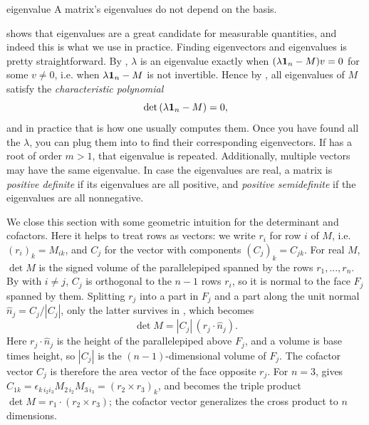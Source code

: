 \begin{proposition}{}{eigenvalue}
  A matrix's eigenvalues do not depend on the basis. 
\end{proposition}

 shows that eigenvalues are a great candidate
for measurable quantities, and indeed this is what we use in practice.
Finding eigenvectors and eigenvalues is pretty straightforward.
By , $\lambda$ is an eigenvalue exactly when
$(\lambda{\mathbf 1}_n-M)v=0$ for some $v\neq0$, i.e. when $\lambda{\mathbf 1}_n-M$ is not
invertible. Hence by ,
all eigenvalues of $M$ satisfy the
{\it characteristic polynomial}
\begin{equation}\label{eq:characteristicPolynomial}
\det\left(\lambda{\mathbf 1}_n-M\right)=0,
\end{equation}
and in practice that is how one usually computes them.
Once you have found all the $\lambda$, you can plug them
into  to find their corresponding
eigenvectors. If 
has a root of order $m>1$, that eigenvalue is repeated.
Additionally, multiple vectors may have the same eigenvalue.
In case the eigenvalues are real, a matrix is
{\it positive definite} 
if its eigenvalues are all positive, and
{\it positive semidefinite} 
if the eigenvalues are all nonnegative.

We close this section with some geometric intuition for the determinant
and cofactors.
Here it helps to treat rows as vectors: we write $r_i$ for row $i$ of $M$,
i.e. $(r_i)_k=M_{ik}$, and $C_j$ for the vector with components
$(C_j)_k=C_{jk}$.
For real $M$, $\det M$ is the signed volume of the parallelepiped spanned by
the rows $r_1,...,r_n$. By  with $i\neq j$,
$C_j$ is orthogonal to the $n-1$ rows $r_i$, so it is normal to the
face $F_j$ spanned by them. Splitting $r_j$ into a part in $F_j$ and a part
along the unit normal $\hat{n}_j=C_j/|C_j|$, only the latter survives in
, which becomes
\begin{equation}
  \det M=|C_j|\,(r_j\cdot\hat{n}_j).
\end{equation}
Here $r_j\cdot\hat{n}_j$ is the height of the parallelepiped above $F_j$, and
a volume is base times height, so $|C_j|$ is the $(n-1)$-dimensional volume of
$F_j$. The cofactor vector $C_j$ is therefore the area vector of the face
opposite $r_j$. For $n=3$,  gives
$C_{1k}=\epsilon_{k\,i_2i_3}M_{2\,i_2}M_{3\,i_3}=(r_2\times r_3)_k$, and
 becomes the triple product
$\det M=r_1\cdot(r_2\times r_3)$; the cofactor vector generalizes the cross
product to $n$ dimensions. 

